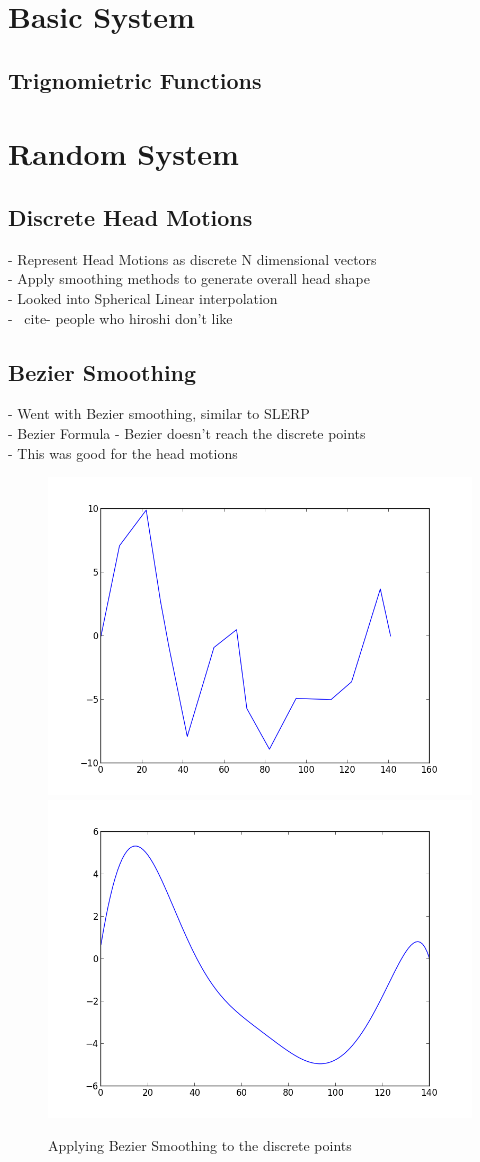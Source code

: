 \documentclass[bsc,frontabs,twoside,singlespacing,parskip]{infthesis}
\begin{document}
\section{Basic System}

\subsection{Trignomietric Functions}

\section{Random System}

\subsection{Discrete Head Motions}
- Represent Head Motions as discrete N dimensional vectors \\
- Apply smoothing methods to generate overall head shape \\
- Looked into Spherical Linear interpolation \\
- \ cite- people who hiroshi don't like\\

\subsection{Bezier Smoothing}

- Went with Bezier smoothing, similar to SLERP\\
- Bezier Formula
- Bezier doesn't reach the discrete points\\
- This was good for the head motions \\

\begin{figure}
	\caption{Applying Bezier Smoothing to the discrete points}
	\includegraphics[width=.6\textwidth]{figure_1.png}
	\includegraphics[width=.6\textwidth]{figure_2.png}
\end{figure}
\end{document}
